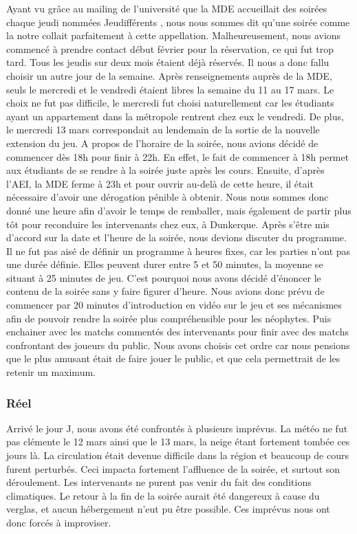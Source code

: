 Ayant vu grâce au mailing de l’université que la MDE accueillait des soirées chaque jeudi
nommées \og Jeudifférents \fg{}, nous nous sommes dit qu’une soirée comme la notre collait
parfaitement à cette appellation. Malheureusement, nous avions commencé à prendre contact
début février pour la réservation, ce qui fut trop tard. Tous les jeudis sur deux mois étaient
déjà réservés.
Il nous a donc fallu choisir un autre jour de la semaine. Après renseignements auprès de la
MDE, seuls le mercredi et le vendredi étaient libres la semaine du 11 au 17 mars. Le choix ne
fut pas difficile, le mercredi fut choisi naturellement car les étudiants ayant un appartement
dans la métropole rentrent chez eux le vendredi. De plus, le mercredi 13 mars correspondait
au lendemain de la sortie de la nouvelle extension du jeu.
A propos de l’horaire de la soirée, nous avions décidé de commencer dès 18h pour finir à
22h. En effet, le fait de commencer à 18h permet aux étudiants de se rendre à la soirée juste
après les cours. Ensuite, d’après l’AEI, la MDE ferme à 23h et pour ouvrir au-delà de cette
heure, il était nécessaire d’avoir une dérogation pénible à obtenir. Nous nous sommes donc
donné une heure afin d’avoir le temps de remballer, mais également de partir plus tôt pour
reconduire les intervenants chez eux, à Dunkerque.
Après s’être mis d’accord sur la date et l’heure de la soirée, nous devions discuter du
programme.
Il ne fut pas aisé de définir un programme à heures fixes, car les parties n’ont pas une durée
définie. Elles peuvent durer entre 5 et 50 minutes, la moyenne se situant à 25 minutes de jeu.
C’est pourquoi nous avons décidé d’énoncer le contenu de la soirée sans y faire figurer
d’heure.
Nous avions donc prévu de commencer par 20 minutes d’introduction en vidéo sur le jeu et
ses mécanismes afin de pouvoir rendre la soirée plus compréhensible pour les néophytes.
Puis enchainer avec les matchs commentés des intervenants pour finir avec des matchs
confrontant des joueurs du public. Nous avons choisis cet ordre car nous pensions que le plus
amusant était de faire jouer le public, et que cela permettrait de les retenir un maximum.

\subsubsection{Réel}%
\label{ssub:reel}

Arrivé le jour J, nous avons été confrontés à plusieurs imprévus.
La météo ne fut pas clémente le 12 mars ainsi que le 13 mars, la neige étant fortement
tombée ces jours là. La circulation était devenue difficile dans la région et beaucoup de cours
furent perturbés.
Ceci impacta fortement l’affluence de la soirée, et surtout son déroulement. Les intervenants
ne purent pas venir du fait des conditions climatiques. Le retour à la fin de la soirée aurait été
dangereux à cause du verglas, et aucun hébergement n’eut pu être possible.
Ces imprévus nous ont donc forcés à improviser.

